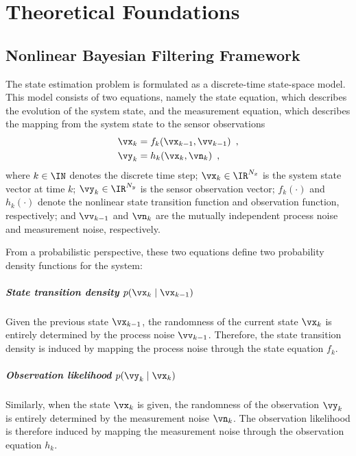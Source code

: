 \chapter{Theoretical Foundations}
\label{chap:theoretical_foundations}

\section{Nonlinear Bayesian Filtering Framework}
\label{sec:nonlinear_bayesian_filtering}

The state estimation problem is formulated as a discrete-time state-space model. This model consists of two equations, namely the state equation, which describes the evolution of the system state, and the measurement equation, which describes the mapping from the system state to the sensor observations
\begin{align}
	\vx_k &= f_k(\vx_{k-1}, \vv_{k-1}) \label{eq:state_equation} \enspace, \\
	\vy_k &= h_k(\vx_k, \vn_k) \label{eq:measurement_equation} \enspace,
\end{align}
where $k \in \IN$ denotes the discrete time step; $\vx_k \in \IR^{N_x}$ is the system state vector at time $k$; $\vy_k \in \IR^{N_y}$ is the sensor observation vector; $f_k(\cdot)$ and $h_k(\cdot)$ denote the nonlinear state transition function and observation function, respectively; and $\vv_{k-1}$ and $\vn_k$ are the mutually independent process noise and measurement noise, respectively.

From a probabilistic perspective, these two equations define two probability density functions for the system:

\paragraph{State transition density $p(\vx_k \mid \vx_{k-1})$} Given the previous state $\vx_{k-1}$, the randomness of the current state $\vx_k$ is entirely determined by the process noise $\vv_{k-1}$. Therefore, the state transition density is induced by mapping the process noise through the state equation $f_k$.

\paragraph{Observation likelihood $p(\vy_k \mid \vx_k)$} Similarly, when the state $\vx_k$ is given, the randomness of the observation $\vy_k$ is entirely determined by the measurement noise $\vn_k$. The observation likelihood is therefore induced by mapping the measurement noise through the observation equation $h_k$.

